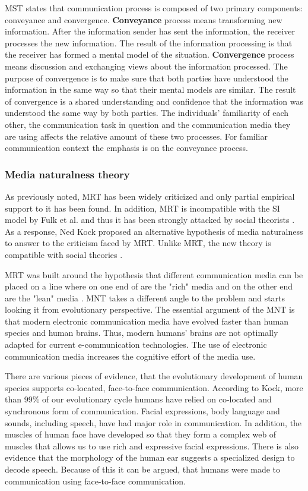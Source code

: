 \documentclass[english,12pt,a4paper,pdftex]{article}
\begin{document}
\ac{MST} states that communication process is composed of two primary components: conveyance and convergence. \textbf{Conveyance} process means transforming new information. After the information sender has sent the information, the receiver processes the new information. The result of the information processing is that the receiver has formed a mental model of the situation. \textbf{Convergence} process means discussion and exchanging views about the information processed. The purpose of convergence is to make sure that both parties have understood the information in the same way so that their mental models are similar. The result of convergence is a shared understanding and confidence that the information was understood the same way by both parties. The individuals' familiarity of each other, the communication task in question and the communication media they are using affects the relative amount of these two processes. For familiar communication context the emphasis is on the conveyance process. \citep{dennis2008}

\subsubsection{Media naturalness theory}

As previously noted, \ac{MRT} has been widely criticized and only partial empirical support to it has been found. In addition, \ac{MRT} is incompatible with the \ac{SI} model by Fulk et al. \citep{fulk1987} \citep{schmitz1991} and thus it has been strongly attacked by social theorists \citep{kock2005}. As a response, Ned Kock proposed an alternative hypothesis of media naturalness to answer to the criticism faced by \ac{MRT}. Unlike \ac{MRT}, the new theory is compatible with social theories \citep{kock2005}.

\ac{MRT} was built around the hypothesis that different communication media can be placed on a line where on one end of are the "rich" media and on the other end are the "lean" media \citep{daft1986}. \Ac{MNT} takes a different angle to the problem and starts looking it from evolutionary perspective. The essential argument of the \ac{MNT} is that modern electronic communication media have evolved faster than human species and human brains. Thus, modern humans' brains are not optimally adapted for current e-communication technologies. The use of electronic communication media increases the cognitive effort of the media use. \citep{kock2005}

There are various pieces of evidence, that the evolutionary development of human species supports co-located, face-to-face communication. According to Kock, more than 99\% of our evolutionary cycle humans have relied on co-located and synchronous form of communication. Facial expressions, body language and sounds, including speech, have had major role in communication. In addition, the muscles of human face have developed so that they form a complex web of muscles that allows us to use rich and expressive facial expressions. There is also evidence that the morphology of the human ear suggests a specialized design to decode speech. Because of this it can be argued, that humans were made to communication using face-to-face communication. \citep{kock2005}
\end{document}
